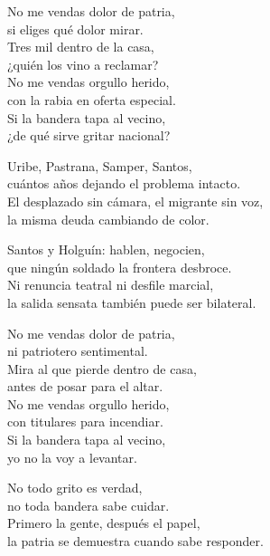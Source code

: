 \begin{lyrics}
No me vendas dolor de patria,\\
si eliges qué dolor mirar.\\
Tres mil dentro de la casa,\\
¿quién los vino a reclamar?\\
No me vendas orgullo herido,\\
con la rabia en oferta especial.\\
Si la bandera tapa al vecino,\\
¿de qué sirve gritar nacional?

Uribe, Pastrana, Samper, Santos,\\
cuántos años dejando el problema intacto.\\
El desplazado sin cámara, el migrante sin voz,\\
la misma deuda cambiando de color.

Santos y Holguín: hablen, negocien,\\
que ningún soldado la frontera desbroce.\\
Ni renuncia teatral ni desfile marcial,\\
la salida sensata también puede ser bilateral.

No me vendas dolor de patria,\\
ni patriotero sentimental.\\
Mira al que pierde dentro de casa,\\
antes de posar para el altar.\\
No me vendas orgullo herido,\\
con titulares para incendiar.\\
Si la bandera tapa al vecino,\\
yo no la voy a levantar.

No todo grito es verdad,\\
no toda bandera sabe cuidar.\\
Primero la gente, después el papel,\\
la patria se demuestra cuando sabe responder.
\end{lyrics}

